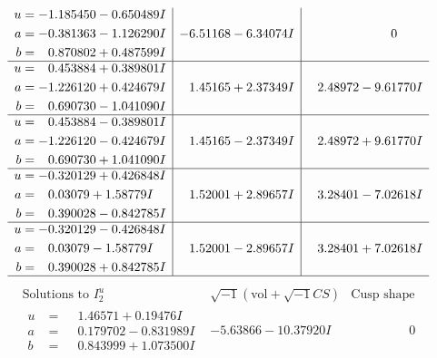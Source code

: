 \documentclass[1p]{elsarticle_modified}
\theoremstyle{definition}
\newcommand{\I}{\sqrt{-1}}
\begin{document}
$$\begin{array}{c|c|c}
\begin{aligned}
u &= -1.185450 - 0.650489 I \\
a &= -0.381363 - 1.126290 I \\
b &= \phantom{-}0.870802 + 0.487599 I\end{aligned}
 & -6.51168 - 6.34074 I & \phantom{-0.000000 } 0 \\ \hline\begin{aligned}
u &= \phantom{-}0.453884 + 0.389801 I \\
a &= -1.226120 + 0.424679 I \\
b &= \phantom{-}0.690730 - 1.041090 I\end{aligned}
 & \phantom{-}1.45165 + 2.37349 I & \phantom{-}2.48972 - 9.61770 I \\ \hline\begin{aligned}
u &= \phantom{-}0.453884 - 0.389801 I \\
a &= -1.226120 - 0.424679 I \\
b &= \phantom{-}0.690730 + 1.041090 I\end{aligned}
 & \phantom{-}1.45165 - 2.37349 I & \phantom{-}2.48972 + 9.61770 I \\ \hline\begin{aligned}
u &= -0.320129 + 0.426848 I \\
a &= \phantom{-}0.03079 + 1.58779 I \\
b &= \phantom{-}0.390028 - 0.842785 I\end{aligned}
 & \phantom{-}1.52001 + 2.89657 I & \phantom{-}3.28401 - 7.02618 I \\ \hline\begin{aligned}
u &= -0.320129 - 0.426848 I \\
a &= \phantom{-}0.03079 - 1.58779 I \\
b &= \phantom{-}0.390028 + 0.842785 I\end{aligned}
 & \phantom{-}1.52001 - 2.89657 I & \phantom{-}3.28401 + 7.02618 I\\
 \hline 
 \end{array}$$\newpage$$\begin{array}{c|c|c}  
\text{Solutions to }I^u_{2}& \I (\text{vol} + \sqrt{-1}CS) & \text{Cusp shape}\\
 \hline 
\begin{aligned}
u &= \phantom{-}1.46571 + 0.19476 I \\
a &= \phantom{-}0.179702 - 0.831989 I \\
b &= \phantom{-}0.843999 + 1.073500 I\end{aligned}
 & -5.63866 - 10.37920 I & \phantom{-0.000000 } 0 \\ \hline\begin{aligned}

\end{aligned}
\end{array}$$
\end{document}
